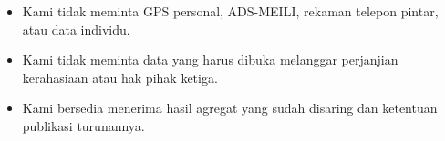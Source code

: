 \documentclass[12pt]{article}
\begin{document}
\begin{itemize}
  \item Kami tidak meminta GPS personal, ADS-MEILI, rekaman telepon pintar, atau data individu.
  \item Kami tidak meminta data yang harus dibuka melanggar perjanjian kerahasiaan atau hak pihak ketiga.
  \item Kami bersedia menerima hasil agregat yang sudah disaring dan ketentuan publikasi turunannya.
\end{itemize}

\LampiranAbstraksi
\end{document}
